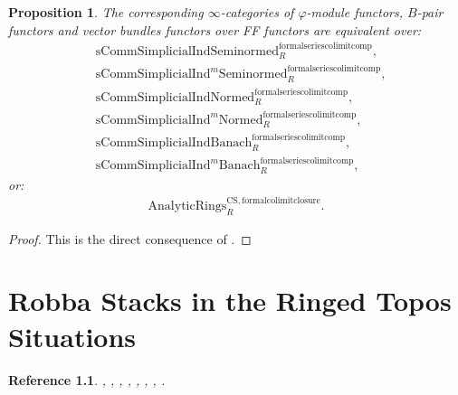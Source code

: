 \documentclass[12pt]{book}
\newtheorem{proposition}{Proposition}
\newtheorem{reference}{Reference}
\begin{document}
\begin{proposition}
The corresponding $\infty$-categories of $\varphi$-module functors, $B$-pair functors and vector bundles functors over FF functors are equivalent over:
\begin{align}
&\mathrm{sComm}\mathrm{Simplicial}\mathrm{Ind}\mathrm{Seminormed}^\mathrm{formalseriescolimitcomp}_R,\\
&\mathrm{sComm}\mathrm{Simplicial}\mathrm{Ind}^m\mathrm{Seminormed}^\mathrm{formalseriescolimitcomp}_R,\\
&\mathrm{sComm}\mathrm{Simplicial}\mathrm{Ind}\mathrm{Normed}^\mathrm{formalseriescolimitcomp}_R,\\
&\mathrm{sComm}\mathrm{Simplicial}\mathrm{Ind}^m\mathrm{Normed}^\mathrm{formalseriescolimitcomp}_R,\\
&\mathrm{sComm}\mathrm{Simplicial}\mathrm{Ind}\mathrm{Banach}^\mathrm{formalseriescolimitcomp}_R,\\
&\mathrm{sComm}\mathrm{Simplicial}\mathrm{Ind}^m\mathrm{Banach}^\mathrm{formalseriescolimitcomp}_R,	
\end{align}
or:
\begin{align}
\mathrm{AnalyticRings}^\mathrm{CS,formalcolimitclosure}_R.	
\end{align}	
\end{proposition}
\begin{proof}
This is the direct consequence of \cite[Theorem 9.3.12]{KL1}.	
\end{proof}




\chapter{Robba Stacks in the Ringed Topos Situations}

\begin{reference}
\cite{KL1}, \cite{KL2}, \cite{Sch1}, \cite{Sch}, \cite{Fon}, \cite{FF}, \cite{F1}, \cite{Ta}.
\end{reference}
\end{document}
